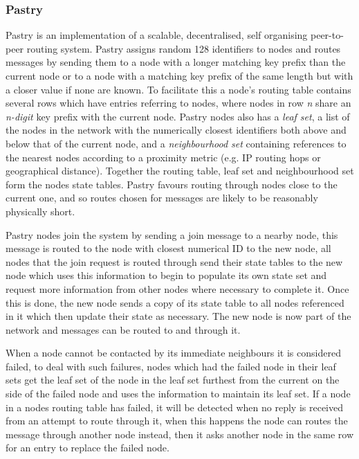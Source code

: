 \documentclass{article}
\begin{document}
\subsubsection{Pastry}
Pastry \cite{pastry} is an implementation of a scalable, decentralised, self organising peer-to-peer routing system. Pastry assigns random 128 identifiers to nodes and routes messages by sending them to a node with a longer matching key prefix than the current node or to a node with a matching key prefix of the same length but with a closer value if none are known.
To facilitate this a node's routing table contains several rows which have entries referring to nodes, where nodes in row \textit{n} share an \textit{n-digit} key prefix with the current node.
Pastry nodes also has a \textit{leaf set}, a list of the nodes in the network with the numerically closest identifiers both above and below that of the current node, and a \textit{neighbourhood set} containing references to the nearest nodes according to a proximity metric (e.g. IP routing hops or geographical distance). Together the routing table, leaf set and neighbourhood set form the nodes state tables.
Pastry favours routing through nodes close to the current one, and so routes chosen for messages are likely to be reasonably physically short.

Pastry nodes join the system by sending a join message to a nearby node, this message is routed to the node with closest numerical ID to the new node, all nodes that the join request is routed through send their state tables to the new node which uses this information to begin to populate its own state set and request more information from other nodes where necessary to complete it. Once this is done, the new node sends a copy of its state table to all nodes referenced in it which then update their state as necessary. The new node is now part of the network and messages can be routed to and through it.

When a node cannot be contacted by its immediate neighbours it is considered failed, to deal with such failures, nodes which had the failed node in their leaf sets get the leaf set of the node in the leaf set furthest from the current on the side of the failed node and uses the information to maintain its leaf set. If a node in a nodes routing table has failed, it will be detected when no reply is received from an attempt to route through it, when this happens the node can routes the message through another node instead, then it asks another node in the same row for an entry to replace the failed node.
\\
\\
\end{document}
